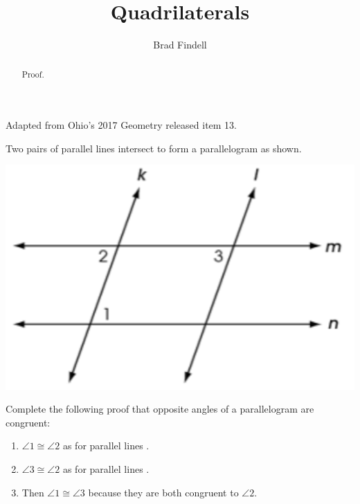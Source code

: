 \documentclass[nooutcomes]{ximera}
\title{Quadrilaterals}
\author{Brad Findell}
\begin{document}
\begin{abstract}
Proof. 
\end{abstract}
\maketitle


\begin{problem}
Adapted from Ohio's 2017 Geometry released item 13. 

Two pairs of parallel lines intersect to form a parallelogram as shown.  
\begin{image}
\includegraphics{Q13.png}
\end{image}
Complete the following proof that opposite angles of a parallelogram are congruent: 

\begin{enumerate}
\item $\angle 1 \cong \angle 2$ as 
for parallel lines .
\item $\angle 3 \cong \angle 2$ as for parallel lines .
\item Then $\angle 1 \cong \angle 3$ because they are both congruent 
to $\angle 2$. 
\end{enumerate}
\end{problem}
\end{document}
